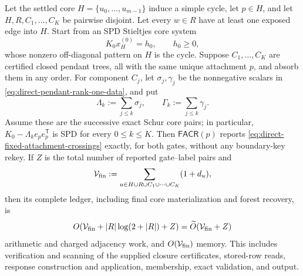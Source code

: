 \begin{theorem}
\label{thm:direct-fixed-attachment-cycle-reporter}
Let the settled core $H=\{u_0,\ldots,u_{m-1}\}$ induce a simple cycle, let
$p\in H$, and let $H,R,C_1,\ldots,C_K$ be pairwise disjoint.  Let every
$w\in R$ have at least one exposed edge into $H$.
Start from an SPD Stieltjes core system
\begin{equation*}
 K_0x_H^{(0)}=h_0,
 \qquad h_0\geq0,
\end{equation*}
whose nonzero off-diagonal pattern on $H$ is the cycle.  Suppose
$C_1,\ldots,C_K$ are certified closed pendant trees, all with the same unique
attachment $p$, and absorb them in any order.  For component $C_j$, let
$\sigma_j,\gamma_j$ be the nonnegative scalars in
\cref{eq:direct-pendant-rank-one-data}, and put
\begin{equation}
 \Lambda_k:=\sum_{j\leq k}\sigma_j,
 \qquad
 \Gamma_k:=\sum_{j\leq k}\gamma_j.
 \label{eq:direct-fixed-attachment-cumulative-data}
\end{equation}
Assume these are the successive exact Schur core pairs; in particular,
$K_0-\Lambda_ke_pe_p^\mathsf T$ is SPD for every $0\leq k\leq K$.
Then $\mathsf{FACR}(p)$ reports
\cref{eq:direct-fixed-attachment-crossings} exactly, for both gates, without
any boundary-key rekey.  If $Z$ is the total number of reported
gate--label pairs and
\begin{equation}
 \mathcal V_{\rm fin}
 :=\sum_{u\in H\cup R\cup C_1\cup\cdots\cup C_K}(1+d_u),
 \label{eq:direct-fixed-attachment-final-volume}
\end{equation}
then its complete ledger, including final core materialization and forest
recovery, is
\begin{equation}
 O\!\left(\mathcal V_{\rm fin}+|R|\log(2+|R|)+Z\right)
 =\widetilde O(\mathcal V_{\rm fin}+Z)
 \label{eq:direct-fixed-attachment-work}
\end{equation}
arithmetic and charged adjacency work, and $O(\mathcal V_{\rm fin})$ memory.
This includes verification and scanning of the supplied closure certificates,
stored-row reads, response construction and application, membership, exact
validation, and output.
\end{theorem}

